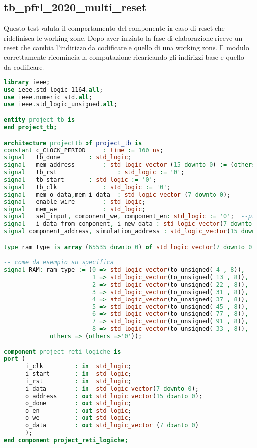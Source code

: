\documentclass [a4paper, 12pt]{article}
\begin{document}
\subsection{tb\_pfrl\_2020\_multi\_reset}
Questo test valuta il comportamento del componente in caso di reset che ridefinisca le working zone. Dopo aver iniziato la fase di elaborazione riceve un reset che cambia l'indirizzo da codificare e quello di una working zone. Il modulo correttamente ricomincia la computazione ricaricando gli indirizzi base e quello da codificare.
\begin{lstlisting}[language=VHDL, caption=tb\_pfrl\_2020\_repeated.vhd, basicstyle=\tiny, breaklines]
library ieee;
use ieee.std_logic_1164.all;
use ieee.numeric_std.all;
use ieee.std_logic_unsigned.all;

entity project_tb is
end project_tb;

architecture projecttb of project_tb is
constant c_CLOCK_PERIOD		: time := 100 ns;
signal   tb_done		: std_logic;
signal   mem_address		: std_logic_vector (15 downto 0) := (others => '0');
signal   tb_rst	                : std_logic := '0';
signal   tb_start		: std_logic := '0';
signal   tb_clk		        : std_logic := '0';
signal   mem_o_data,mem_i_data	: std_logic_vector (7 downto 0);
signal   enable_wire  		: std_logic;
signal   mem_we		        : std_logic;
signal   sel_input, component_we, component_en: std_logic := '0';  --propri
signal   i_data_from_component, i_new_data : std_logic_vector(7 downto 0);
signal component_address, simulation_address : std_logic_vector(15 downto 0);

type ram_type is array (65535 downto 0) of std_logic_vector(7 downto 0);

-- come da esempio su specifica
signal RAM: ram_type := (0 => std_logic_vector(to_unsigned( 4 , 8)),
                         1 => std_logic_vector(to_unsigned( 13 , 8)),
                         2 => std_logic_vector(to_unsigned( 22 , 8)),
                         3 => std_logic_vector(to_unsigned( 31 , 8)),
                         4 => std_logic_vector(to_unsigned( 37 , 8)),
                         5 => std_logic_vector(to_unsigned( 45 , 8)),
                         6 => std_logic_vector(to_unsigned( 77 , 8)),
                         7 => std_logic_vector(to_unsigned( 91 , 8)),
                         8 => std_logic_vector(to_unsigned( 33 , 8)),
			 others => (others =>'0'));

component project_reti_logiche is
port (
      i_clk         : in  std_logic;
      i_start       : in  std_logic;
      i_rst         : in  std_logic;
      i_data        : in  std_logic_vector(7 downto 0);
      o_address     : out std_logic_vector(15 downto 0);
      o_done        : out std_logic;
      o_en          : out std_logic;
      o_we          : out std_logic;
      o_data        : out std_logic_vector (7 downto 0)
      );
end component project_reti_logiche;



\end{lstlisting}
\end{document}
